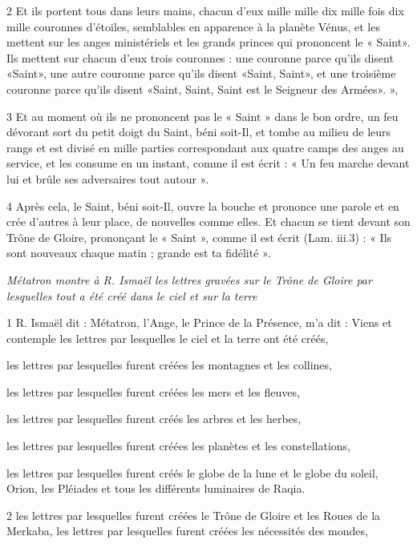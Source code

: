\par 2 Et ils portent tous dans leurs mains, chacun d'eux mille mille dix mille fois dix mille couronnes d'étoiles, semblables en apparence à la planète Vénus, et les mettent sur les anges ministériels et les grands princes qui prononcent le « Saint». Ils mettent sur chacun d'eux trois couronnes : une couronne parce qu'ils disent «Saint», une autre couronne parce qu'ils disent «Saint, Saint», et une troisième couronne parce qu'ils disent «Saint, Saint, Saint est le Seigneur des Armées». »,

\par 3 Et au moment où ils ne prononcent pas le « Saint » dans le bon ordre, un feu dévorant sort du petit doigt du Saint, béni soit-Il, et tombe au milieu de leurs rangs et est divisé en mille parties correspondant aux quatre camps des anges au service, et les consume en un instant, comme il est écrit : « Un feu marche devant lui et brûle ses adversaires tout autour ».

\par 4 Après cela, le Saint, béni soit-Il, ouvre la bouche et prononce une parole et en crée d'autres à leur place, de nouvelles comme elles. Et chacun se tient devant son Trône de Gloire, prononçant le « Saint », comme il est écrit (Lam. iii.3) : « Ils sont nouveaux chaque matin ; grande est ta fidélité ».



\par \textit{Métatron montre à R. Ismaël les lettres gravées sur le Trône de Gloire par lesquelles tout a été créé dans le ciel et sur la terre}

\par 1 R. Ismaël dit : Métatron, l'Ange, le Prince de la Présence, m'a dit : Viens et contemple les lettres par lesquelles le ciel et la terre ont été créés,
\par les lettres par lesquelles furent créées les montagnes et les collines,
\par les lettres par lesquelles furent créées les mers et les fleuves,
\par les lettres par lesquelles furent créés les arbres et les herbes,
\par les lettres par lesquelles furent créées les planètes et les constellations,
\par les lettres par lesquelles furent créés le globe de la lune et le globe du soleil, Orion, les Pléiades et tous les différents luminaires de Raqia.

\par 2 les lettres par lesquelles furent créées le Trône de Gloire et les Roues de la Merkaba, les lettres par lesquelles furent créées les nécessités des mondes,

